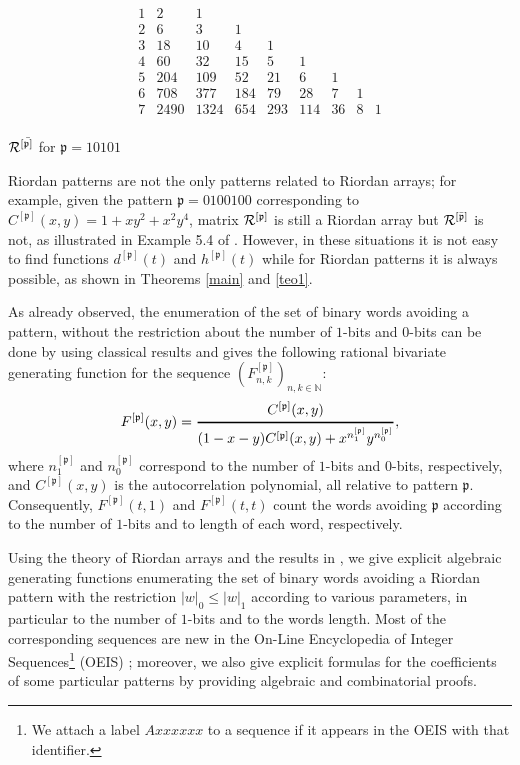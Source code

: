 \begin{example}
\begin{table}[htb]
$$\begin{array}{c|cccccccc}
1 & 2 & 1 & & &  & & &\\
2 & 6& 3 & 1 & & & &  &\\
3 & 18 & 10 & 4 & 1 & & &  &\\
4 & 60 & 32 & 15 & 5 & 1& & & \\
5 & 204 & 109 & 52 & 21 & 6 &1 & &\\
6 & 708 & 377 & 184 & 79 & 28 & 7& 1 &\\
7 & 2490 & 1324 &  654 &293 & 114 & 36 &  8 &1\\
\end{array}
$$
\caption{\label{Rprimob} ${\cal{R}^{[\bar{\mathfrak{p}]}}}$ for $\mathfrak{p}=10101$}
\end{table}
\end{example}

\begin{rem}
 Riordan patterns are not the only patterns related to Riordan arrays; for
 example, given the pattern $\mathfrak{p}=0100100$ corresponding to
 $C^{[\mathfrak{p}]}(x,y)=1+xy^2+x^2y^4$, matrix ${\cal{R}^{[\mathfrak{p}]}}$
 is still a Riordan array but ${\cal{R}^{[\bar{\mathfrak{p}}]}}$
is not, as illustrated in Example 5.4 of \citep{Baccherini2007BinaryWE}. However, in these
situations it is not easy to find functions $d^{[\mathfrak{p}]}(t)$ and
$h^{[\mathfrak{p}]}(t)$ while for Riordan patterns it is always possible, as
shown in Theorems \ref{main} and \ref{teo1}.
\end{rem}


As already observed, the enumeration of the set of binary words avoiding a
pattern, without the restriction about the number of $1$-bits  and $0$-bits can be
done by using classical results and gives
the following rational bivariate generating function for the sequence
$(F_{n,k}^{[\mathfrak{p}]})_{n,k \in \mathbb{N}}:$ $$F^{[\mathfrak{p}]}(x,y)
=\genfrac{}{}{1pt}{0}{C^{[\mathfrak{p}]}(x,y)}{(1-x-y)C^{[\mathfrak{p}]}(x,y)
+x^{n_1^{[\mathfrak{p}]}}y^{n_0^{[\mathfrak{p}]}}},$$ where
$n_1^{[\mathfrak{p}]}$ and  $n_0^{[\mathfrak{p}]}$ correspond to the number of
$1$-bits  and $0$-bits, respectively, and $C^{[\mathfrak{p}]}(x,y)$ is the
autocorrelation polynomial, all relative to pattern $\mathfrak{p}$.
Consequently, $F^{[\mathfrak{p}]}(t,1)$ and $F^{[\mathfrak{p}]}(t,t)$ count the
words avoiding $\mathfrak{p}$ according to the number of $1$-bits  and to length
of each word, respectively.

Using the theory of Riordan arrays and the results in \citep{MERLINI20112988}, we give
explicit algebraic generating functions enumerating the set of binary words
avoiding a Riordan pattern with the restriction $|w|_0\leq |w|_1$ according to
various parameters, in particular to the number of $1$-bits  and to the words length.
Most of the corresponding sequences are new in the On-Line Encyclopedia of
Integer Sequences\footnote{We attach a label $Axxxxxx$ to a
sequence if it appears in the OEIS with that identifier.} (OEIS) \citep{OEIS};
moreover, we also give explicit formulas for the coefficients of some
particular patterns by providing algebraic and combinatorial proofs.

